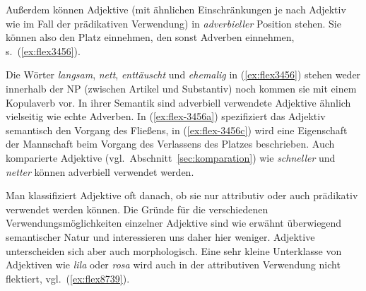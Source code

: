 \begin{exe}
  \ex \label{ex:flex9858}
  \begin{xlist}
  \end{xlist}
\end{exe}


Außerdem können Adjektive (mit ähnlichen Einschränkungen je nach Adjektiv wie im Fall der prädikativen Verwendung) in \textit{adverbieller} Position stehen.
Sie können also den Platz einnehmen, den sonst Adverben einnehmen, s.\ (\ref{ex:flex3456}).

\begin{exe}
  \ex \label{ex:flex3456}
  \begin{xlist}
  \end{xlist}
\end{exe}

Die Wörter \textit{langsam}, \textit{nett}, \textit{enttäuscht} und \textit{ehemalig} in (\ref{ex:flex3456}) stehen weder innerhalb der NP (zwischen Artikel und Substantiv) noch kommen sie mit einem Kopulaverb vor.
In ihrer Semantik sind adverbiell verwendete Adjektive ähnlich vielseitig wie echte Adverben.
In (\ref{ex:flex-3456a}) spezifiziert das Adjektiv semantisch den Vorgang des Fließens, in (\ref{ex:flex-3456c}) wird eine Eigenschaft der Mannschaft beim Vorgang des Verlassens des Platzes beschrieben.
Auch komparierte Adjektive (vgl.\ Abschnitt~\ref{sec:komparation}) wie \textit{schneller} und \textit{netter} können adverbiell verwendet werden.

Man klassifiziert Adjektive oft danach, ob sie nur attributiv oder auch prädikativ verwendet werden können.
Die Gründe für die verschiedenen Verwendungsmöglichkeiten einzelner Adjektive sind wie erwähnt überwiegend semantischer Natur und interessieren uns daher hier weniger.
Adjektive unterscheiden sich aber auch morphologisch.
Eine sehr kleine Unterklasse von Adjektiven wie \textit{lila} oder \textit{rosa} wird auch in der attributiven Verwendung nicht flektiert, vgl.\ (\ref{ex:flex8739}).

\begin{exe}
  \ex \label{ex:flex8739}
  \begin{xlist}
  \end{xlist}
\end{exe}

